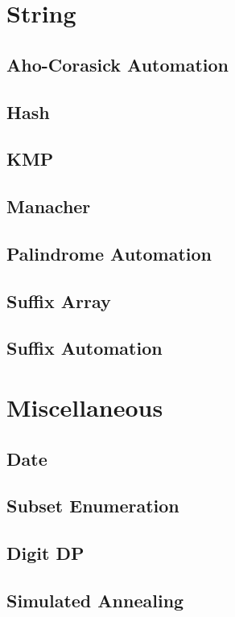 \section{String}
\subsection{Aho-Corasick Automation}
\raggedbottom
\hrulefill
\subsection{Hash}
\raggedbottom
\hrulefill
\subsection{KMP}
\raggedbottom
\hrulefill
\subsection{Manacher}
\raggedbottom
\hrulefill
\subsection{Palindrome Automation}
\raggedbottom
\hrulefill
\subsection{Suffix Array}
\raggedbottom
\hrulefill
\subsection{Suffix Automation}
\raggedbottom
\hrulefill

\section{Miscellaneous}
\subsection{Date}
\raggedbottom
\hrulefill
\subsection{Subset Enumeration}
\raggedbottom
\hrulefill
\subsection{Digit DP}
\raggedbottom
\hrulefill
\subsection{Simulated Annealing}
\raggedbottom
\hrulefill